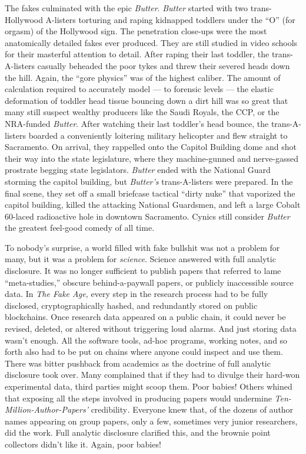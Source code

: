 The fakes culminated with the epic \emph{Butter}. \emph{Butter} started
with two trans-Hollywood A-listers torturing and raping kidnapped
toddlers under the ``O'' (for orgasm) of the Hollywood sign. The
penetration close-ups were the most anatomically detailed fakes ever
produced. They are still studied in video schools for their masterful
attention to detail. After raping their last toddler, the
trans-A-listers casually beheaded the poor tykes and threw their severed
heads down the hill. Again, the ``gore physics'' was of the highest
caliber. The amount of calculation required to accurately model --- to
forensic levels --- the elastic deformation of toddler head tissue
bouncing down a dirt hill was so great that many still suspect wealthy
producers like the Saudi Royals, the CCP, or the NRA-funded
\emph{Butter}. After watching their last toddler's head bounce, the
trans-A-listers boarded a conveniently loitering military helicopter and
flew straight to Sacramento. On arrival, they rappelled onto the Capitol
Building dome and shot their way into the state legislature, where they
machine-gunned and nerve-gassed prostrate begging state legislators.
\emph{Butter} ended with the National Guard storming the capitol
building, but \emph{Butter's} trans-A-listers were prepared. In the
final scene, they set off a small briefcase tactical ``dirty nuke'' that
vaporized the capitol building, killed the attacking National Guardsmen,
and left a large Cobalt 60-laced radioactive hole in downtown
Sacramento. Cynics still consider \emph{Butter} the greatest feel-good
comedy of all time.

To nobody's surprise, a world filled with fake bullshit was not a
problem for many, but it was a problem for \emph{science}. Science
answered with full analytic disclosure. It was no longer sufficient to
publish papers that referred to lame ``meta-studies,'' obscure
behind-a-paywall papers, or publicly inaccessible source data. In
\emph{The Fake Age,} every step in the research process had to be fully
disclosed, cryptographically hashed, and redundantly stored on public
blockchains. Once research data appeared on a public chain, it could
never be revised, deleted, or altered without triggering loud alarms.
And just storing data wasn't enough. All the software tools, ad-hoc
programs, working notes, and so forth also had to be put on chains where
anyone could inspect and use them. There was bitter pushback from
academics as the doctrine of full analytic disclosure took over. Many
complained that if they had to divulge their hard-won experimental data,
third parties might scoop them. Poor babies! Others whined that exposing
all the steps involved in producing papers would undermine
\emph{Ten-Million-Author-Papers'} credibility\emph{.} Everyone knew
that, of the dozens of author names appearing on group papers, only a
few, sometimes very junior researchers, did the work. Full analytic
disclosure clarified this, and the brownie point collectors didn't like
it. Again, poor babies!

